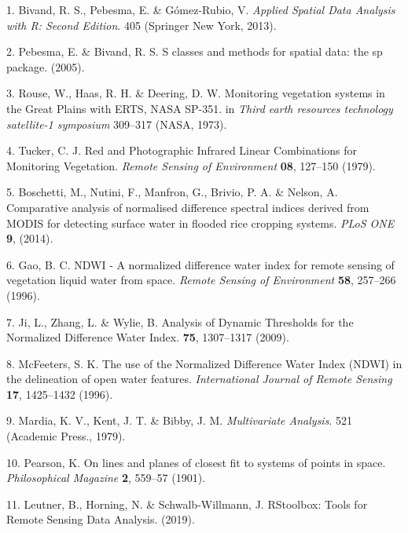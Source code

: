 \documentclass[12pt,oneside]{article}
\begin{document}
\hypertarget{refs}{}
\leavevmode\hypertarget{ref-Bivand_et_al_2013}{}%
1. Bivand, R. S., Pebesma, E. \& Gómez-Rubio, V. \emph{Applied Spatial Data Analysis with R: Second Edition}. 405 (Springer New York, 2013).

\leavevmode\hypertarget{ref-Pebesma_Bivand_2005}{}%
2. Pebesma, E. \& Bivand, R. S. S classes and methods for spatial data: the sp package. (2005).

\leavevmode\hypertarget{ref-Rouse_et_al_1973}{}%
3. Rouse, W., Haas, R. H. \& Deering, D. W. Monitoring vegetation systems in the Great Plains with ERTS, NASA SP-351. in \emph{Third earth resources technology satellite-1 symposium} 309--317 (NASA, 1973).

\leavevmode\hypertarget{ref-Tucker_1979}{}%
4. Tucker, C. J. Red and Photographic Infrared Linear Combinations for Monitoring Vegetation. \emph{Remote Sensing of Environment} \textbf{08}, 127--150 (1979).

\leavevmode\hypertarget{ref-Boschetti_et_al_2014}{}%
5. Boschetti, M., Nutini, F., Manfron, G., Brivio, P. A. \& Nelson, A. Comparative analysis of normalised difference spectral indices derived from MODIS for detecting surface water in flooded rice cropping systems. \emph{PLoS ONE} \textbf{9}, (2014).

\leavevmode\hypertarget{ref-Gao_1996}{}%
6. Gao, B. C. NDWI - A normalized difference water index for remote sensing of vegetation liquid water from space. \emph{Remote Sensing of Environment} \textbf{58}, 257--266 (1996).

\leavevmode\hypertarget{ref-Ji_et_al_2009}{}%
7. Ji, L., Zhang, L. \& Wylie, B. Analysis of Dynamic Thresholds for the Normalized Difference Water Index. \textbf{75}, 1307--1317 (2009).

\leavevmode\hypertarget{ref-McFeeters_1996}{}%
8. McFeeters, S. K. The use of the Normalized Difference Water Index (NDWI) in the delineation of open water features. \emph{International Journal of Remote Sensing} \textbf{17}, 1425--1432 (1996).

\leavevmode\hypertarget{ref-Mardia_et_al_1979}{}%
9. Mardia, K. V., Kent, J. T. \& Bibby, J. M. \emph{Multivariate Analysis}. 521 (Academic Press., 1979).

\leavevmode\hypertarget{ref-Pearson_1901}{}%
10. Pearson, K. On lines and planes of closest fit to systems of points in space. \emph{Philosophical Magazine} \textbf{2}, 559--57 (1901).

\leavevmode\hypertarget{ref-Leutner_et_al_2019}{}%
11. Leutner, B., Horning, N. \& Schwalb-Willmann, J. RStoolbox: Tools for Remote Sensing Data Analysis. (2019).
\end{document}
